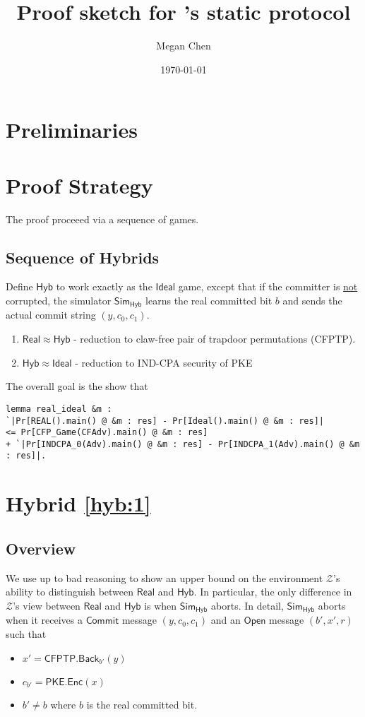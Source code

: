 \documentclass{article}[11pt]
\title{Proof sketch for \cite{CanettiF01}'s static protocol}
\author{Megan Chen}
\date{\today}
\newcommand{\Sim}{{\mathsf{Sim}}} %
\newcommand{\Environment}{{\mathcal{Z}}} %
\newcommand{\Ideal}{{\mathsf{Ideal}}}
\newcommand{\Hyb}{{\mathsf{Hyb}}}
\newcommand{\Real}{{\mathsf{Real}}}
\newcommand{\OpenMsg}{\mathsf{Open}}
\newcommand{\CommitMsg}{\mathsf{Commit}}
\newcommand{\PKE}{\mathsf{PKE}}
\newcommand{\Enc}{\mathsf{Enc}}
\newcommand{\CFPTP}{\mathsf{CFPTP}}
\newcommand{\Back}{\mathsf{Back}}
\begin{document}
\maketitle
\tableofcontents

\section{Preliminaries}

\section{Proof Strategy}
The proof proceeed via a sequence of games.

\subsection{Sequence of Hybrids}
Define $\Hyb$ to work exactly as the $\Ideal$ game, except that if the committer is \underline{not} corrupted, the simulator $\Sim_{\Hyb}$ learns the real committed bit $b$ and sends the actual commit string $(y, c_0, c_1)$.
\begin{enumerate}
	\item\label{hyb:1} $\Real \approx \Hyb$ - reduction to claw-free pair of trapdoor permutations (CFPTP).
	\item\label{hyb:2} $\Hyb \approx \Ideal$ - reduction to IND-CPA security of PKE
\end{enumerate}

The overall goal is the show that
\begin{lstlisting}
lemma real_ideal &m :
`|Pr[REAL().main() @ &m : res] - Pr[Ideal().main() @ &m : res]|
<= Pr[CFP_Game(CFAdv).main() @ &m : res]
+ `|Pr[INDCPA_0(Adv).main() @ &m : res] - Pr[INDCPA_1(Adv).main() @ &m : res]|.
\end{lstlisting}

\section{Hybrid \ref{hyb:1}}

\subsection{Overview}
We use up to bad reasoning to show an upper bound on the environment $\Environment$'s ability to distinguish between $\Real$ and $\Hyb$. In particular, the only difference in $\Environment$'s view between $\Real$ and $\Hyb$ is when $\Sim_\Hyb$ aborts. In detail, $\Sim_\Hyb$ aborts when it receives a $\CommitMsg$ message $(y, c_0, c_1)$ and an $\OpenMsg$ message $(b', x', r)$ such that
\begin{itemize}
	\item $x' = \CFPTP.\Back_{b'}(y)$
	\item $c_{b'} = \PKE.\Enc(x)$
	\item $b' \ne b$ where $b$ is the real committed bit.
\end{itemize}
\end{document}

